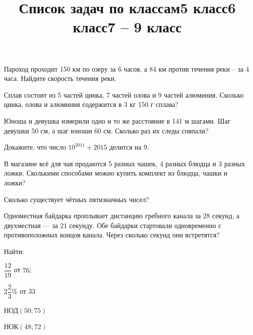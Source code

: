 \title{Список задач по классам}
\title{5 класс}
\begin{listofex}
	\item Пароход проходит 150 км по озеру за 6 часов, а 84 км против течения реки – за 4 часа.
	Найдите скорость течения реки.
	\item Сплав состоит из 5 частей цинка, 7 частей олова и 9 частей алюминия. Сколько цинка,
	олова и алюминия содержится в 3 кг 150 г сплава?
	\item Юноша и девушка измерили одно и то же расстояние в 141 м шагами. Шаг девушки 50 см,
	а шаг юноши 60 см. Сколько раз их следы совпали?
\end{listofex}
\title{6 класс}
\begin{listofex}
	\item Докажите, что число \( 10^{2011}+2015 \) делится на \( 9 \).
	\item В магазине всё для чая продаются 5 разных чашек, 4 разных блюдца и 3 разных ложки. Сколькими способами можно купить комплект из блюдца, чашки и ложки?
	\item Сколько существует чётных пятизначных чисел?
	\item Одноместная байдарка проплывает дистанцию гребного канала за \( 28 \) секунд, а
	двухместная --- за \( 21 \) секунду. Обе байдарки стартовали одновременно с противоположных
	концов канала. Через сколько секунд они встретятся?
	\item Найти:
	\begin{enumcols}[itemcolumns=4]
		\item \( \dfrac{12}{19} \) от \( 76 \);
		\item \( 2\dfrac{2}{3}\% \) от \( 33 \)
		\item НОД\( (50;75) \)
		\item НОК\( (48;72) \)
	\end{enumcols}
\end{listofex}
\title{7 -- 9 класс}
